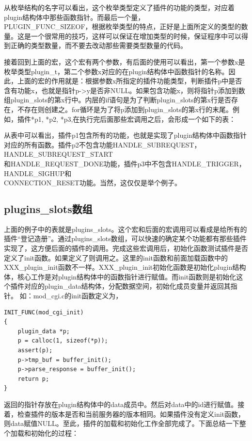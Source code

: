 \documentclass[12pt, dvipdfm]{article}
\begin{document}
从枚举结构的名字可以看出，这个枚举类型定义了插件的功能的类型，对应着plugin结构体中那些函数指针。而最后一个量，\\PLUGIN\_FUNC\_SIZEOF，根据枚举类型的特点，正好是上面所定义的类型的数量。这是一个很常用的技巧，这样可以保证在增加类型的时候，保证程序中可以得到正确的类型数量，而不要去改动那些需要类型数量的代码。


接着回到上面的宏，这个宏有两个参数，有后面的使用可以看出，第一个参数x是枚举类型plugin\_t，第二个参数x对应的在plugin结构体中函数指针的名称。因此，上面的宏的作用就是：根据参数x所指定的插件功能类型，判断插件p中是否含有功能x，也就是指针p->y是否非NULL。如果包含功能x，则将指针p添加到数组plugin\_slots的第x行中。内层的if语句是为了判断plugin\_slots的第x行是否存在，不存在则创建之。for循环是为了将p添加到plugin\_slots的第x行的末尾。例如，插件*p1, *p2, *p3,在执行完后面那些宏调用之后，会形成一个如下的表：

从表中可以看出，插件p1包含所有的功能，也就是实现了plugin结构体中函数指针对应的所有函数。插件p2不包含功能HANDLE\_SUBREQUEST，HANDLE\_SUBREQUEST\_START\\和HANDLE\_REQUEST\_DONE功能，插件p3中不包含HANDLE\_TRIGGER，HANDLE\_SIGHUP和\\CONNECTION\_RESET功能。当然，这仅仅是举个例子。

\subsection{plugins\_slots数组}
上面的例子中的表就是plugins\_slots。这个宏和后面的宏调用可以看成是给所有的插件“登记造册”。通过plugins\_slots数组，可以快速的确定某个功能都有那些插件实现了，这方便后面的插件的调用。完成这些宏调用后，初始化函数测试插件是否定义了init函数。如果定义了则调用之。这里的init函数和前面加载函数中的XXX\_plugin\_init函数不一样。XXX\_plugin\_init初始化函数是初始化plugin结构体，核心工作是对plugin结构体中的函数指针进行赋值。而init函数则是初始化这个插件对应的plugin\_data结构体，分配数据空间，初始化成员变量并返回其指针。
如：mod\_cgi.c的init函数定义为，

\begin{verbatim}
INIT_FUNC(mod_cgi_init)
{
	plugin_data *p;
	p = calloc(1, sizeof(*p));
	assert(p);
	p->tmp_buf = buffer_init();
	p->parse_response = buffer_init();
	return p;
}
\end{verbatim}

返回的指针存放在plugin结构体中的data成员中。然后对data中的id进行赋值。接着，检查插件的版本是否和当前服务器的版本相同。如果插件没有定义init函数，则data赋值NULL。至此，插件的加载和初始化工作全部完成了。下面总结一下整个加载和初始化的过程：
\end{document}
